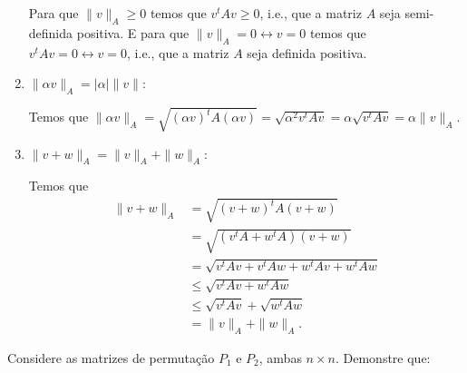 \begin{questions}
\begin{solution}
\begin{enumerate}
                Para que $\| v \|_A \geq 0$ temos que $v^t A v \geq 0$, i.e., que a matriz $A$ seja semi-definida positiva. E para que $\| v \|_A = 0 \leftrightarrow v = 0$ temos que $v^t A v = 0 \leftrightarrow v = 0$, i.e., que a matriz $A$ seja definida positiva.

            \item $\| \alpha v \|_A = | \alpha | \| v \|$:

                Temos que $\| \alpha v \|_A = \sqrt{ \left( \alpha v \right)^t A \left( \alpha v \right) } = \sqrt{\alpha^2 v^t A v} = \alpha \sqrt{v^t A v} = \alpha \| v \|_A$.

            \item $\| v + w \|_A = \| v \|_A + \| w \|_A$:

                Temos que 
                \begin{align*}
                    \| v + w \|_A &= \sqrt{ \left( v + w \right)^t A \left( v + w \right)} \\
                    &= \sqrt{ \left( v^t A + w^t A \right) \left( v + w \right)} \\
                    &= \sqrt{v^t A v + v^t A w + w^t A v + w^t A w} \\
                    &\leq \sqrt{v^t A v + w^t A w} \\
                    &\leq \sqrt{v^t A v} + \sqrt{w^t A w} \\
                    &= \| v \|_A + \| w \|_A.
                \end{align*}
        \end{enumerate}
    \end{solution}

    \question Considere as matrizes de permuta\c{c}\~{a}o $P_1$ e $P_2$, ambas $n \times n$. Demonstre que:
\end{questions}
